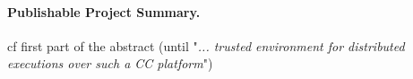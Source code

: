 \documentclass[11pt,twoside,a4paper]{article}
\begin{document}
\paragraph{Publishable Project Summary.} 

cf first part of the abstract (until "\emph{...  trusted environment for distributed executions over such a CC platform}")







\end{document}
